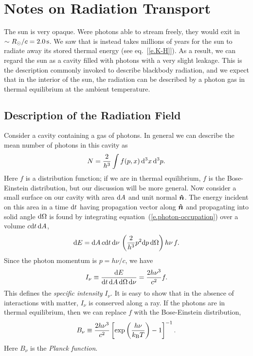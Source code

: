 \chapter{Notes on Radiation Transport}

\newcommand{\unitvector}[1]{\ensuremath{\bvec{\hat{#1}}}}
\newcommand{\unitn}{\unitvector{n}}
\newcommand{\unitk}{\unitvector{k}}
\newcommand{\unitj}{\unitvector{\jmath}}
\newcommand{\Ledd}{\ensuremath{L_{\mathrm{Edd}}}}
\newcommand{\Prad}{\ensuremath{P_{\mathrm{rad}}}}
\newcommand{\Pgas}{\ensuremath{P_{\mathrm{gas}}}}

The sun is very opaque.  Were photons able to stream freely, they would exit in $\sim R_{\odot}/c = 2.0\,\mathrm{s}$.  We saw that is instead takes millions of years for the sun to radiate away its stored thermal energy (see eq.~[\ref{e.K-H}]).  As a result, we can regard the sun as a cavity filled with photons with a very slight leakage.  This is the description commonly invoked to describe blackbody radiation, and we expect that in the interior of the sun, the radiation can be described by a photon gas in thermal equilibrium at the ambient temperature.

\section{Description of the Radiation Field}

Consider a cavity containing a gas of photons. In general we can describe the mean number of photons in this cavity as
\begin{equation}\label{e.photon-occupation}
 N = \frac{2}{h^{3}}\int f(p,x)\,\mathrm{d}^{3}x\,\mathrm{d}^{3}p.
\end{equation}
Here $f$ is a distribution function; if we are in thermal equilibrium, $f$ is the Bose-Einstein distribution, but our discussion will be more general.  Now consider a small surface on our cavity with area $\mathrm{d} A$ and unit normal $\unitn$.  The energy incident on this area in a time $\mathrm{d} t$ having propagation vector along $\unitn$ and propagating into solid angle $\mathrm{d}\Omega$ is found by integrating equation~(\ref{e.photon-occupation}) over a volume $c\mathrm{d} t\,\mathrm{d} A$,
\[
\mathrm{d} E = \mathrm{d} A\,c\mathrm{d} t\,\mathrm{d}\nu\,\left( \frac{2}{h^{3}}p^{2}\mathrm{d} p\,\mathrm{d}\Omega\right)  h\nu \, f.
\]
Since the photon momentum is $p = h\nu/c$, we have
\begin{equation}\label{e.specific-intensity}
I_{\nu} \equiv \frac{\mathrm{d} E}{\mathrm{d} t\,\mathrm{d} A\,\mathrm{d}\Omega\,\mathrm{d}\nu} = \frac{2h\nu^{3}}{c^{2}} f.
\end{equation}
This defines the \emph{specific intensity} $I_{\nu}$.  It is easy to show that in the absence of interactions with matter, $I_{\nu}$ is conserved along a ray.  If the photons are in thermal equilibrium, then we can replace $f$ with the Bose-Einstein distribution,
\begin{equation}\label{e.Bnu}
B_{\nu} \equiv \frac{2 h\nu^{3}}{c^{2}} \left[\exp\left(\frac{h\nu}{k_\mathrm{B} T}\right)-1\right]^{-1}.
\end{equation}
Here $B_{\nu}$ is the \emph{Planck function}.

